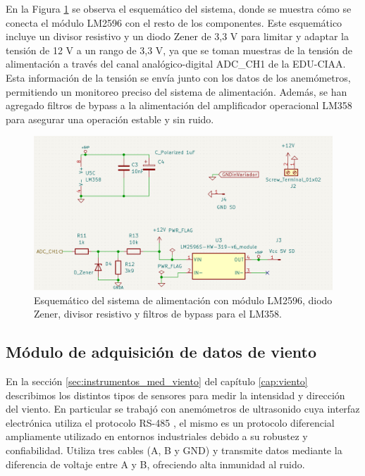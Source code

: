 En la Figura \ref{fig:esquemPowerSupply} se observa el esquemático del sistema, donde se muestra cómo se conecta el módulo LM2596 con el resto de los componentes. Este esquemático incluye un divisor resistivo y un diodo Zener de 3,3 \unit{\volt} para limitar y adaptar la tensión de 12 \unit{\volt} a un rango de 3,3 \unit{\volt}, ya que se toman muestras de la tensión de alimentación a través del canal analógico-digital ADC\_CH1 de la EDU-CIAA. Esta información de la tensión se envía junto con los datos de los anemómetros, permitiendo un monitoreo preciso del sistema de alimentación. Además, se han agregado filtros de bypass a la alimentación del amplificador operacional LM358 para asegurar una operación estable y sin ruido.

\begin{figure}[H]
    \centering
    \includegraphics[width=0.9\linewidth]{Figuras/datalogger/Hardware/esquemPowerSupply.png}
    \caption{Esquemático del sistema de alimentación con módulo LM2596, diodo Zener, divisor resistivo y filtros de bypass para el LM358.}
    \label{fig:esquemPowerSupply}
\end{figure}

\subsection{Módulo de adquisición de datos de viento}\label{sec:moduloAdquisicionDatoViento}

En la sección \ref{sec:instrumentos_med_viento} del capítulo \ref{cap:viento} describimos los distintos tipos de sensores para medir la intensidad y dirección del viento. En particular se trabajó con anemómetros de ultrasonido cuya interfaz electrónica utiliza el protocolo RS-485 \cite{rs485Protocol}, el mismo es un protocolo diferencial ampliamente utilizado en entornos industriales debido a su robustez y confiabilidad. Utiliza tres cables (A, B y GND) y transmite datos mediante la diferencia de voltaje entre A y B, ofreciendo alta inmunidad al ruido. 

